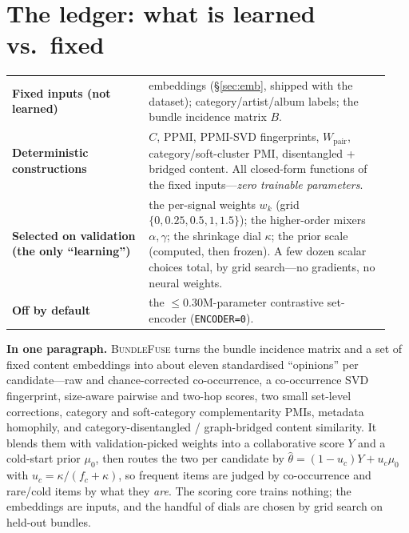 \documentclass[11pt]{article}
\theoremstyle{remark}
\newcommand{\code}[1]{\texttt{\small #1}}
\begin{document}
\section{The ledger: what is learned vs.\ fixed}
\label{sec:ledger}

\begin{center}\small
\begin{tabular}{@{}p{0.34\linewidth} p{0.60\linewidth}@{}}
\toprule
\textbf{Fixed inputs (not learned)} & embeddings (\S\ref{sec:emb}, shipped with the dataset); category/artist/album
labels; the bundle incidence matrix $B$. \\[2pt]
\textbf{Deterministic constructions} & $C$, PPMI, PPMI-SVD fingerprints, $W_{\text{pair}}$, category/soft-cluster
PMI, disentangled + bridged content. All closed-form functions of the fixed inputs---\emph{zero trainable
parameters}. \\[2pt]
\textbf{Selected on validation (the only ``learning'')} & the per-signal weights $w_k$ (grid
$\{0,0.25,0.5,1,1.5\}$); the higher-order mixers $\alpha,\gamma$; the shrinkage dial $\kappa$; the prior scale
(computed, then frozen). A few dozen scalar choices total, by grid search---no gradients, no neural weights. \\[2pt]
\textbf{Off by default} & the $\le 0.30$M-parameter contrastive set-encoder (\code{ENCODER=0}). \\
\bottomrule
\end{tabular}
\end{center}

\begin{keybox}
\textbf{In one paragraph.} \textsc{BundleFuse} turns the bundle incidence matrix and a set of fixed content
embeddings into about eleven standardised ``opinions'' per candidate---raw and chance-corrected co-occurrence, a
co-occurrence SVD fingerprint, size-aware pairwise and two-hop scores, two small set-level corrections, category and
soft-category complementarity PMIs, metadata homophily, and category-disentangled / graph-bridged content
similarity. It blends them with validation-picked weights into a collaborative score $Y$ and a cold-start prior
$\mu_0$, then routes the two per candidate by $\hat\theta=(1-u_c)Y+u_c\mu_0$ with $u_c=\kappa/(f_c+\kappa)$, so
frequent items are judged by co-occurrence and rare/cold items by what they \emph{are}. The scoring core trains
nothing; the embeddings are inputs, and the handful of dials are chosen by grid search on held-out bundles.
\end{keybox}
\end{document}
